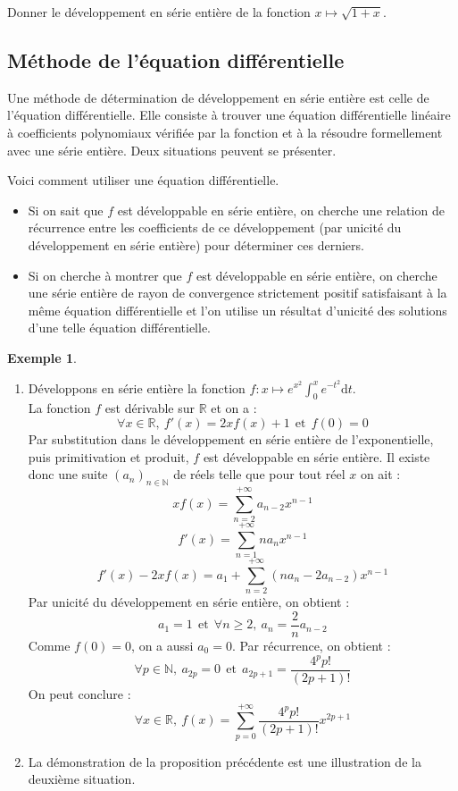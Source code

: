 \documentclass[french]{article}
\newcommand{\N}{\mathbb{N}}
\newcommand{\R}{\mathbb{R}}
\renewcommand{\d}{\text{d}}
\theoremstyle{plain}
\theoremstyle{definition}
\newtheorem*{ex}{Exemple}
\theoremstyle{remark}
\begin{document}
\begin{exo}
	Donner le développement en série entière de la fonction $x\mapsto\sqrt{1+x}$.
\end{exo}

\subsection{Méthode de l'équation différentielle}

Une méthode de détermination de développement en série entière est celle de l'équation différentielle. Elle consiste à trouver une équation différentielle linéaire à coefficients polynomiaux vérifiée par la fonction et à la résoudre formellement avec une série entière. Deux situations peuvent se présenter.

\begin{met}
	Voici comment utiliser une équation différentielle.
	\begin{itemize}
		\item Si on sait que $f$ est développable en série entière, on cherche une relation de récurrence entre les coefficients de ce développement (par unicité du développement en série entière) pour déterminer ces derniers.
		\item Si on cherche à montrer que $f$ est développable en série entière, on cherche une série entière de rayon de convergence strictement positif satisfaisant à la même équation différentielle et l'on utilise un résultat d'unicité des solutions d'une telle équation différentielle.
	\end{itemize}
\end{met}

\begin{ex}
	\begin{enumerate}
		\item Développons en série entière la fonction $f:x\mapsto\displaystyle e^{x^2}\int_{0}^{x}e^{-t^2}\d t$. \\
		La fonction $f$ est dérivable sur $\R$ et on a : $$\forall x\in\R,\ f'(x)=2xf(x)+1\ \ \text{et}\ \ f(0)=0$$
		Par substitution dans le développement en série entière de l'exponentielle, puis primitivation et produit, $f$ est développable en série entière. Il existe donc une suite $(a_n)_{n\in\N}$ de réels telle que pour tout réel $x$ on ait : $$xf(x)=\sum_{n=2}^{+\infty}a_{n-2}x^{n-1}$$
		$$f'(x)=\sum_{n=1}^{+\infty}na_nx^{n-1}$$
		$$f'(x)-2xf(x)=a_1+\sum_{n=2}^{+\infty}(na_n-2a_{n-2})x^{n-1}$$
		Par unicité du développement en série entière, on obtient : $$a_1=1\ \ \text{et}\ \ \forall n\geqslant2,\ a_n=\frac{2}{n}a_{n-2}$$ Comme $f(0)=0$, on a aussi $a_0=0$. Par récurrence, on obtient : $$\forall p\in\N,\ a_{2p}=0\ \ \text{et}\ \ a_{2p+1}=\frac{4^pp!}{(2p+1)!}$$ On peut conclure : $$\forall x\in\R,\ f(x)=\sum_{p=0}^{+\infty}\frac{4^pp!}{(2p+1)!}x^{2p+1}$$
		\item La démonstration de la proposition précédente est une illustration de la deuxième situation.
	\end{enumerate}
\end{ex}
\end{document}

